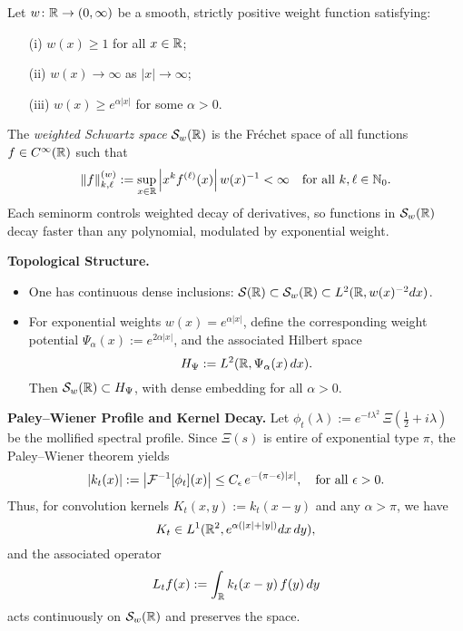 \begin{definition}\label{def:weighted_schwartz_space}
Let \( w \colon \mathbb{R} \to (0, \infty) \) be a smooth, strictly positive weight function satisfying:
\begin{enumerate}
    \item[\textup{(i)}] \( w(x) \ge 1 \) for all \( x \in \mathbb{R} \);
    \item[\textup{(ii)}] \( w(x) \to \infty \) as \( |x| \to \infty \);
    \item[\textup{(iii)}] \( w(x) \ge e^{\alpha |x|} \) for some \( \alpha > 0 \).
\end{enumerate}

The \emph{weighted Schwartz space} \( \mathcal{S}_w(\mathbb{R}) \) is the Fréchet space of all functions \( f \in C^\infty(\mathbb{R}) \) such that
\[
\| f \|^{(w)}_{k,\ell} := \sup_{x \in \mathbb{R}} \left| x^k f^{(\ell)}(x) \right| w(x)^{-1} < \infty \quad \text{for all } k,\ell \in \mathbb{N}_0.
\]
Each seminorm controls weighted decay of derivatives, so functions in \( \mathcal{S}_w(\mathbb{R}) \) decay faster than any polynomial, modulated by exponential weight.

\medskip
\noindent\textbf{Topological Structure.}
\begin{itemize}
    \item One has continuous dense inclusions: \( \mathcal{S}(\mathbb{R}) \subset \mathcal{S}_w(\mathbb{R}) \subset L^2(\mathbb{R}, w(x)^{-2} dx) \).

    \item For exponential weights \( w(x) = e^{\alpha |x|} \), define the corresponding weight potential \( \Psi_\alpha(x) := e^{2\alpha |x|} \), and the associated Hilbert space
    \[
    H_{\Psi} := L^2(\mathbb{R}, \Psi_\alpha(x)\, dx).
    \]
    Then \( \mathcal{S}_w(\mathbb{R}) \subset H_{\Psi} \), with dense embedding for all \( \alpha > 0 \).
\end{itemize}

\medskip
\noindent\textbf{Paley--Wiener Profile and Kernel Decay.}
Let \( \phi_t(\lambda) := e^{-t\lambda^2} \, \Xi\left( \tfrac{1}{2} + i\lambda \right) \) be the mollified spectral profile. Since \( \Xi(s) \) is entire of exponential type \( \pi \), the Paley--Wiener theorem yields
\[
|k_t(x)| := \left| \mathcal{F}^{-1}[\phi_t](x) \right| \le C_\epsilon \, e^{-(\pi - \epsilon)|x|}, \quad \text{for all } \epsilon > 0.
\]
Thus, for convolution kernels \( K_t(x,y) := k_t(x - y) \) and any \( \alpha > \pi \), we have
\[
K_t \in L^1(\mathbb{R}^2, e^{\alpha(|x| + |y|)} dx\,dy),
\]
and the associated operator
\[
L_t f(x) := \int_{\mathbb{R}} k_t(x - y)\, f(y)\, dy
\]
acts continuously on \( \mathcal{S}_w(\mathbb{R}) \) and preserves the space.


\end{definition}
